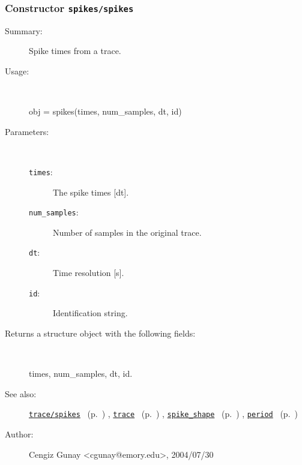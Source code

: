 \subsubsection[Constructor \texttt{spikes}]{Constructor \texttt{spikes/spikes}}%
%
\label{ref_spikes__spikes}%
\hypertarget{ref_spikes__spikes}{}%
\begin{description}
\item[Summary:]Spike times from a trace.
%
\item[Usage:]~%
\begin{lyxcode}%
obj = spikes(times, num\_samples, dt, id)
%
\end{lyxcode}%
%
%
\item[Parameters:]~
\begin{description}%
\item[\texttt{times}:]
 The spike times [dt].
\item[\texttt{num\_samples}:]
 Number of samples in the original trace.
\item[\texttt{dt}:]
 Time resolution [s].
\item[\texttt{id}:]
 Identification string.
\end{description}%
%
\item[Returns a structure object with the following fields:
]~

	times, num\_samples, dt, id.
%
%
\item[See also:]%
\hyperlink{ref_trace__spikes}{\texttt{trace/spikes}}%
\ (p.~\pageref{ref_trace__spikes})%
%
, \hyperlink{ref_trace}{\texttt{trace}}%
\ (p.~\pageref{ref_trace})%
%
, \hyperlink{ref_spike_shape}{\texttt{spike\_shape}}%
\ (p.~\pageref{ref_spike_shape})%
%
, \hyperlink{ref_period}{\texttt{period}}%
\ (p.~\pageref{ref_period})%
%
%
\item[Author:]%
Cengiz Gunay <cgunay@emory.edu>, 2004/07/30
%
\end{description}
\methodline%
